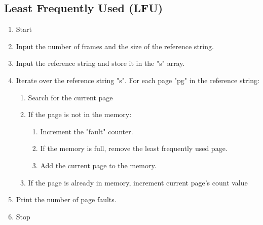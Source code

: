 \subsection{Least Frequently Used (LFU)}
\begin{enumerate}
   \item Start
   \item Input the number of frames and the size of the reference string.
   \item Input the reference string and store it in the "s" array.
   \item Iterate over the reference string "s". For each page "pg" in the reference string:
   \begin{enumerate}
       \item Search for the current page
       \item If the page is not in the memory:
       \begin{enumerate}
           \item Increment the "fault" counter.
           \item If the memory is full, remove the least frequently used page.
           \item Add the current page to the memory.
       \end{enumerate}
       \item If the page is already in memory, increment current page's count value
   \end{enumerate}
   \item Print the number of page faults.
   \item Stop
\end{enumerate}


